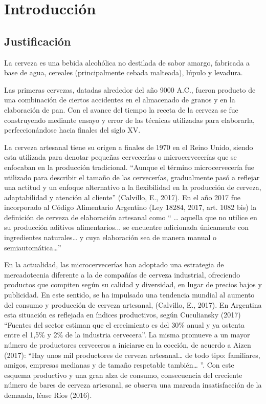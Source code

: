 \chapter{Introducción}
\section{Justificación}
    \par
    La cerveza es una bebida alcohólica no destilada de sabor amargo, fabricada a base de agua, cereales (principalmente cebada malteada), lúpulo y levadura.
    \par
    Las primeras cervezas, datadas alrededor del año 9000 A.C., fueron producto de una combinación de ciertos accidentes en el almacenado de granos y en la elaboración de pan. Con el avance del tiempo la receta de la cerveza se fue construyendo mediante ensayo y error de las técnicas utilizadas para elaborarla, perfeccionándose hacia finales del siglo XV.
    \par
    La cerveza artesanal tiene su origen a finales de 1970 en el Reino Unido, siendo esta utilizada para denotar pequeñas cervecerías o microcervecerías que se enfocaban en la producción tradicional. “Aunque el término microcervecería fue utilizado para describir el tamaño de las cervecerías, gradualmente pasó a reflejar una actitud y un enfoque alternativo a la flexibilidad en la producción de cerveza, adaptabilidad y atención al cliente” (Calvillo, E., 2017). En el año 2017 fue incorporado al Código Alimentario Argentino (Ley 18284, 2017, art. 1082 bis) la definición de cerveza de elaboración artesanal como “ … aquella que no utilice en su producción aditivos alimentarios... se encuentre adicionada únicamente con ingredientes naturales… y cuya elaboración sea de manera manual o semiautomática…”
    \par
    En la actualidad, las microcervecerías han adoptado una estrategia de mercadotecnia diferente a la de compañías de cerveza industrial, ofreciendo productos que compiten según su calidad y diversidad, en lugar de precios bajos y publicidad. En este sentido, se ha  impulsado una tendencia mundial al aumento del consumo y producción de cerveza artesanal, (Calvillo, E., 2017). En Argentina esta situación es reflejada en índices productivos, según Cuculiansky (2017) “Fuentes del sector estiman que el crecimiento es del 30\% anual y ya ostenta entre el 1,5\% y 2\% de la industria cervecera”. La misma promueve a un mayor número de productores cerveceros a iniciarse en la cocción, de acuerdo a Aizen (2017): “Hay unos mil productores de cerveza artesanal… de todo tipo: familiares, amigos, empresas medianas y de tamaño respetable también… ”. Con este esquema productivo y una gran alza de consumo, consecuencia del creciente número de bares de cerveza artesanal, se observa una marcada insatisfacción de la demanda, léase Ríos (2016).
